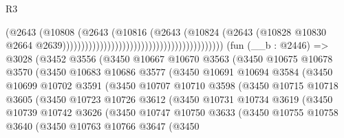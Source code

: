 \begin{lexlean}{R3}
\begin{coremodule}
                                                                          (@2643
                                                                            (@10808
                                                                              (@2643
                                                                                (@10816
                                                                                  (@2643
                                                                                    (@10824
                                                                                      (@2643
                                                                                        (@10828
                                                                                          @10830
                                                                                          @2664
                                                                                          @2639)))))))))))))))))))))))))))))))))))))))))))
    (fun (__b : @2446) =>
    @3028
      (@3452
        @3556
        (@3450
          @10667
          @10670
          @3563
          (@3450
            @10675
            @10678
            @3570
            (@3450
              @10683
              @10686
              @3577
              (@3450
                @10691
                @10694
                @3584
                (@3450
                  @10699
                  @10702
                  @3591
                  (@3450
                    @10707
                    @10710
                    @3598
                    (@3450
                      @10715
                      @10718
                      @3605
                      (@3450
                        @10723
                        @10726
                        @3612
                        (@3450
                          @10731
                          @10734
                          @3619
                          (@3450
                            @10739
                            @10742
                            @3626
                            (@3450
                              @10747
                              @10750
                              @3633
                              (@3450
                                @10755
                                @10758
                                @3640
                                (@3450
                                  @10763
                                  @10766
                                  @3647
                                  (@3450

\end{coremodule}
\end{lexlean}
